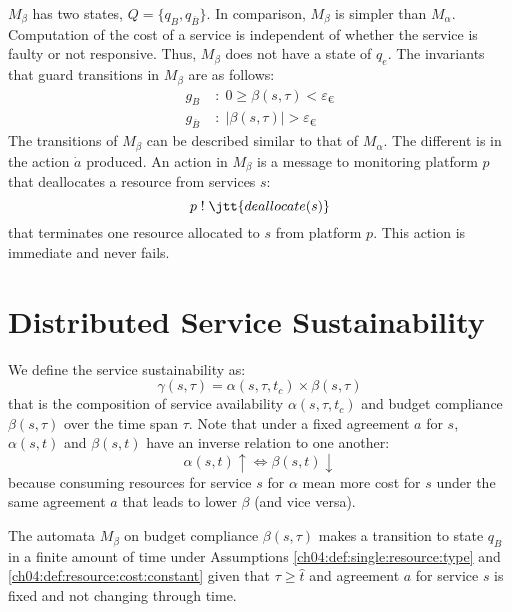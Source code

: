 $M_\beta$ has two states, $Q = \{q_B, q_{\overline{B}} \}$.
In comparison, $M_\beta$ is simpler than $M_\alpha$.
Computation of the cost of a service is independent of whether the service is faulty or not responsive.
Thus, $M_\beta$ does not have a state of $q_e$.
The invariants that guard transitions in $M_\beta$ are as follows:
\begin{align}
g_B \; &: \; 0 \geq \beta(s,\tau) < \varepsilon_{\euro} \\
g_{\overline{B}} \; &: \; |\beta(s,\tau)| > \varepsilon_{\euro}
\end{align}
The transitions of $M_\beta$ can be described similar to that of $M_\alpha$.
The different is in the action $\dot{a}$ produced.
An action in $M_\beta$ is a message to monitoring platform $p$ that deallocates a resource from services $s$:
\[
p \; ! \; \jtt{deallocate(s)}
\]
that terminates one resource allocated to $s$ from platform $p$.
This action is immediate and never fails.

\section{Distributed Service Sustainability} %
\label{ch04:sec:distributed_service_sustainability}
\begin{defn}
\label{ch04:def:service:sustain}
We define the service sustainability as:
\[
\gamma(s,\tau) = \alpha(s,\tau,t_c) \times \beta(s,\tau)
\]
that is the composition of service availability $\alpha(s,\tau,t_c)$ and budget compliance $\beta(s,\tau)$ over the time span $\tau$.
Note that under a fixed agreement $a$ for $s$, $\alpha(s,t)$ and $\beta(s,t)$ have an inverse relation to one another:
\[
\alpha(s,t) \uparrow \iff \beta(s,t) \downarrow
\]
because consuming resources for service $s$ for $\alpha$ mean more cost for $s$ under the same agreement $a$ that leads to lower $\beta$ (and vice versa).
\end{defn}


\begin{theorem}
\label{ch04:thm:budget:comp:conv}
The automata $M_\beta$ on budget compliance $\beta(s,\tau)$ makes a transition to state $q_B$ in a finite amount of time under Assumptions \ref{ch04:def:single:resource:type} and \ref{ch04:def:resource:cost:constant} given that $\tau \geq \hat{t}$ and agreement $a$ for service $s$ is fixed and not changing through time.
\end{theorem}

